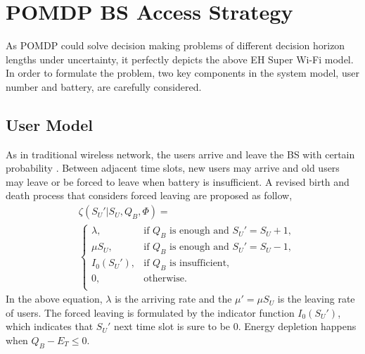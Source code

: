 \documentclass[journal,12pt,draftclsnofoot,onecolumn]{IEEEtran}
\begin{document}
\section{POMDP BS Access Strategy}
As POMDP could solve decision making problems of different decision horizon lengths under uncertainty,
it perfectly depicts the above EH Super Wi-Fi model.
In order to formulate the problem, two key components in the system model, user number and battery, are carefully considered.
\subsection{User Model}
As in traditional wireless network, the users arrive and leave the BS with certain probability \cite{5}.
Between adjacent time slots, new users may arrive and
old users may leave or be forced to leave when battery is insufficient.
A revised birth and death process that considers forced leaving are proposed as follow,
\begin{align}\label{formula1}
&\zeta\left(S_U'| S_U, Q_B, \Phi\right) = \nonumber\\
&\begin{cases}
	\lambda, &\mbox{if $Q_B$ is enough and $S_U' = S_U + 1$,}\\
	\mu S_U, &\mbox{if $Q_B$ is enough and $S_U' = S_U - 1$,}\\
	I_0\left(S_U'\right), &\mbox{if $Q_B$ is insufficient,}\\
	0, &\mbox{otherwise.}\\
\end{cases}
\end{align}
In the above equation, \(\lambda\) is the arriving rate and
the \(\mu' = \mu S_U\) is the leaving rate of users.
The forced leaving is formulated by the indicator function \(I_0\left(S_U'\right)\),
which indicates that \(S_U'\) next time slot is sure to be \(0\).
Energy depletion happens when \(Q_B- E_T \leq 0\).
\end{document}
